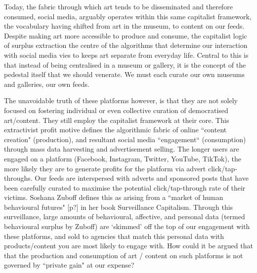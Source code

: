 Today, the fabric through which art tends to be disseminated and therefore consumed, social media, arguably operates within this same capitalist framework, the vocabulary having shifted from art in the museum, to content on our feeds. Despite making art more accessible to produce and consume, the capitalist logic of surplus extraction the centre of the algorithms that determine our interaction with social media vies to keeps art separate from everyday life. Central to this is that instead of being centralised in a museum or gallery, it is the concept of the pedestal itself that we should venerate. We must each curate our own museums and galleries, our own feeds.

The unavoidable truth of these platforms however, is that they are not solely focused on fostering individual or even collective curation of democratised art/content. They still employ the capitalist framework at their core. This extractivist profit motive defines the algorithmic fabric of online ``content creation" (production), and resultant social media ``engagement`` (consumption) through mass data harvesting and advertisement selling. The longer users are engaged on a platform (Facebook, Instagram, Twitter, YouTube, TikTok), the more likely they are to generate profits for the platform via advert click/tap-throughs. Our feeds are interspersed with adverts and sponsored posts that have been carefully curated to maximise the potential click/tap-through rate of their victims. Soshana Zuboff defines this as arising from a ``market of human behavioural futures" [p?] in her book Surveillance Capitalism. Through this surveillance, large amounts of behavioural, affective, and personal data (termed behavioural surplus by Zuboff) are `skimmed' off the top of our engagement with these platforms, and sold to agencies that match this personal data with products/content you are most likely to engage with. How could it be argued that that the production and consumption of art / content on such platforms is not governed by ``private gain" at our expense? 

